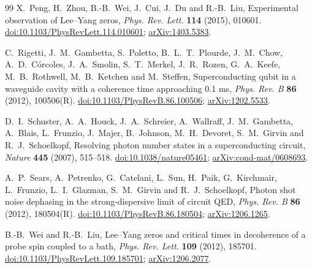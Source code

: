 \documentclass[11pt,reqno]{amsart}
\numberwithin{equation}{section}
\theoremstyle{plain}
\theoremstyle{definition}
\theoremstyle{remark}
\begin{document}
\begin{thebibliography}{99}
X.~Peng, H.~Zhou, B.-B.~Wei, J.~Cui, J.~Du and R.-B.~Liu, Experimental observation of Lee--Yang zeros, \emph{Phys. Rev. Lett.} \textbf{114} (2015), 010601.
\href{https://doi.org/10.1103/PhysRevLett.114.010601}{doi:10.1103/PhysRevLett.114.010601};
\href{https://arxiv.org/abs/1403.5383}{arXiv:1403.5383}.

C.~Rigetti, J.~M.~Gambetta, S.~Poletto, B.~L.~T.~Plourde, J.~M.~Chow, A.~D.~C\'orcoles, J.~A.~Smolin, S.~T.~Merkel, J.~R.~Rozen, G.~A.~Keefe, M.~B.~Rothwell, M.~B.~Ketchen and M.~Steffen, Superconducting qubit in a waveguide cavity with a coherence time approaching 0.1 ms, \emph{Phys. Rev. B} \textbf{86} (2012), 100506(R).
\href{https://doi.org/10.1103/PhysRevB.86.100506}{doi:10.1103/PhysRevB.86.100506};
\href{https://arxiv.org/abs/1202.5533}{arXiv:1202.5533}.

D.~I.~Schuster, A.~A.~Houck, J.~A.~Schreier, A.~Wallraff, J.~M.~Gambetta, A.~Blais, L.~Frunzio, J.~Majer, B.~Johnson, M.~H.~Devoret, S.~M.~Girvin and R.~J.~Schoelkopf, Resolving photon number states in a superconducting circuit, \emph{Nature} \textbf{445} (2007), 515--518.
\href{https://doi.org/10.1038/nature05461}{doi:10.1038/nature05461};
\href{https://arxiv.org/abs/cond-mat/0608693}{arXiv:cond-mat/0608693}.

A.~P.~Sears, A.~Petrenko, G.~Catelani, L.~Sun, H.~Paik, G.~Kirchmair, L.~Frunzio, L.~I.~Glazman, S.~M.~Girvin and R.~J.~Schoelkopf, Photon shot noise dephasing in the strong-dispersive limit of circuit QED, \emph{Phys. Rev. B} \textbf{86} (2012), 180504(R).
\href{https://doi.org/10.1103/PhysRevB.86.180504}{doi:10.1103/PhysRevB.86.180504};
\href{https://arxiv.org/abs/1206.1265}{arXiv:1206.1265}.

B.-B.~Wei and R.-B.~Liu, Lee--Yang zeros and critical times in decoherence of a probe spin coupled to a bath, \emph{Phys. Rev. Lett.} \textbf{109} (2012), 185701.
\href{https://doi.org/10.1103/PhysRevLett.109.185701}{doi:10.1103/PhysRevLett.109.185701};
\href{https://arxiv.org/abs/1206.2077}{arXiv:1206.2077}.

\end{thebibliography}
\end{document}
